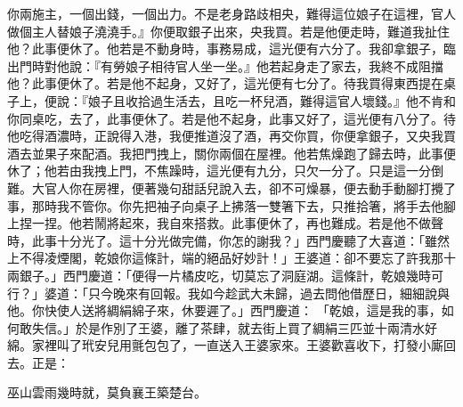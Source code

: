 \begin{showcontents}{}
你兩施主，一個出錢，一個出力。不是老身路歧相央，難得這位娘子在這裡，官人做個主人替娘子澆澆手。』你便取銀子出來，央我買。若是他便走時，難道我扯住他？此事便休了。他若是不動身時，事務易成，這光便有六分了。我卻拿銀子，臨出門時對他說：『有勞娘子相待官人坐一坐。』他若起身走了家去，我終不成阻擋他？此事便休了。若是他不起身，又好了，這光便有七分了。待我買得東西提在桌子上，便說：『娘子且收拾過生活去，且吃一杯兒酒，難得這官人壞錢。』他不肯和你同桌吃，去了，此事便休了。若是他不起身，此事又好了，這光便有八分了。待他吃得酒濃時，正說得入港，我便推道沒了酒，再交你買，你便拿銀子，又央我買酒去並果子來配酒。我把門拽上，關你兩個在屋裡。他若焦燥跑了歸去時，此事便休了；他若由我拽上門，不焦躁時，這光便有九分，只欠一分了。只是這一分倒難。大官人你在房裡，便著幾句甜話兒說入去，卻不可燥暴，便去動手動腳打攪了事，那時我不管你。你先把袖子向桌子上拂落一雙箸下去，只推拾箸，將手去他腳上捏一捏。他若鬧將起來，我自來搭救。此事便休了，再也難成。若是他不做聲時，此事十分光了。這十分光做完備，你怎的謝我？」西門慶聽了大喜道：「雖然上不得凌煙閣，乾娘你這條計，端的絕品好妙計！」王婆道：卻不要忘了許我那十兩銀子。」西門慶道：「便得一片橘皮吃，切莫忘了洞庭湖。這條計，乾娘幾時可行？」婆道：「只今晚來有回報。我如今趁武大未歸，過去問他借歷日，細細說與他。你快使人送將綢絹綿子來，休要遲了。」西門慶道： 「乾娘，這是我的事，如何敢失信。」於是作別了王婆，離了茶肆，就去街上買了綢絹三匹並十兩清水好綿。家裡叫了玳安兒用氈包包了，一直送入王婆家來。王婆歡喜收下，打發小廝回去。正是：

巫山雲雨幾時就，莫負襄王築楚台。


\end{showcontents}
